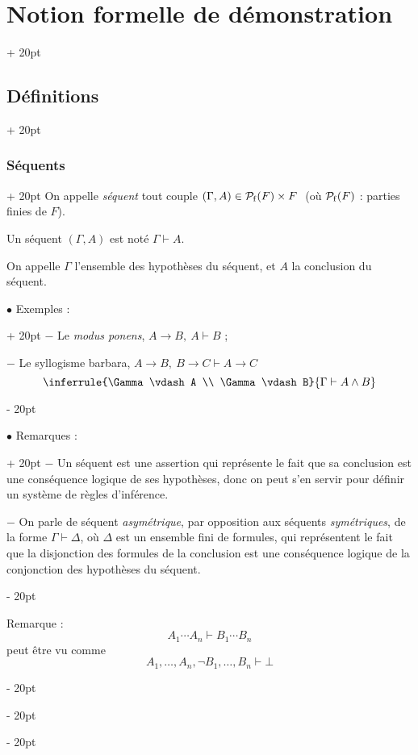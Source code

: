 \documentclass[a4paper, 12pt, twoside]{article}
\newcommand{\ind}[1][20pt]{\advance\leftskip + #1}
\newcommand{\deind}[1][20pt]{\advance\leftskip - #1}
\newenvironment{indt}[2][20pt]{#2 \par \ind[#1]}{\par \deind} %
\begin{document}
\begin{indt}{\section{Notion formelle de démonstration}}
\begin{indt}{\subsection{Définitions}}
\begin{indt}{\subsubsection{Séquents}}
                On appelle \emph{séquent} tout couple $(\Gamma, A) \in \mathcal P_{\rm f}(F) \times F\ $ (où $\mathcal P_{\rm f}(F)$ : parties finies de $F$).

                Un séquent $(\Gamma, A)$ est noté $\Gamma \vdash A$.

                On appelle $\Gamma$ l'ensemble des hypothèses du séquent, et $A$ la conclusion du séquent.

                \vspace{12pt}
                
                \begin{indt}{$\bullet$ Exemples :}
                    $-$ Le \textit{modus ponens}, $A \rightarrow B,\ A \vdash B$ ;

                    $-$ Le syllogisme barbara, $A \rightarrow B,\ B \rightarrow C \vdash A \rightarrow C$
                    \[
                        \inferrule{\Gamma \vdash A \\ \Gamma \vdash B}{\Gamma \vdash A \wedge B}
                    \]
                \end{indt}

                \vspace{12pt}
                
                \begin{indt}{$\bullet$ Remarques :}
                    $-$ Un séquent est une assertion qui représente le fait que sa conclusion est une conséquence logique de ses hypothèses, donc on peut s'en servir pour définir un système de règles d'inférence.

                    \vspace{6pt}
                    
                    $-$ On parle de séquent \emph{asymétrique}, par opposition aux séquents \emph{symétriques}, de la forme $\Gamma \vdash \Delta$, où $\Delta$ est un ensemble fini de formules, qui représentent le fait que la disjonction des formules de la conclusion est une conséquence logique de la conjonction des hypothèses du séquent.
                \end{indt}

                \vspace{12pt}
                
                Remarque :
                \[
                    A_1 \cdots A_n \vdash B_1 \cdots B_n
                \]
                peut être vu comme
                \[
                    A_1, \ldots, A_n, \neg B_1, \ldots, B_n \vdash \bot
                \]


\end{indt}
\end{indt}
\end{indt}
\end{document}
